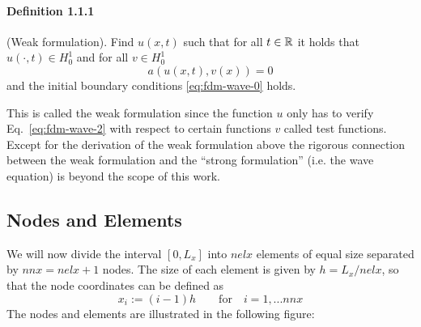 \vspace{.5cm}

\paragraph{Definition 1.1.1}
(Weak formulation). Find $u(x,t)$ such that for all $t\in {\mathbb{R}}$ it holds that $u(\cdot, t)\in H_0^1$ and for
all $v\in H_0^1$
\begin{equation}
a(u(x,t),v(x)) =0  \label{eq:fdm-wave-2}
\end{equation}
and the initial boundary conditions \eqref{eq:fdm-wave-0} holds.

\vspace{.5cm}

This is called the weak formulation since the function $u$ only has to verify Eq.~\eqref{eq:fdm-wave-2} with respect to certain functions $v$ called test functions.
Except for the derivation of the weak formulation above the rigorous connection between the weak formulation
and the ``strong formulation'' (i.e. the wave equation) is beyond the scope of this work.

\subsection{Nodes and Elements}

We will now divide the interval $[0,L_x]$ into $nelx$ elements of equal size separated by $nnx=nelx+1$
nodes. 
The size of each element is given by $h=L_x/nelx$, so that the node coordinates can be defined as
\[
x_i := (i-1)h \qquad \text{for} \quad i=1,...nnx
\]
The nodes and elements are illustrated in the following figure:

\begin{center}
\end{center}


